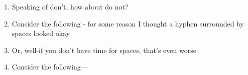 \documentclass{amsart}
\begin{document}
\begin{enumerate}[(1)]
\item Speaking %
of don't, how %
about do not?

\item Consider %
the following - for some %
reason I thought a hyphen surrounded by spaces looked okay

\item %
Or, well-if you %
don't have time for spaces, that's even worse

\item Consider %
the following--- %
\end{enumerate}
\end{document}
